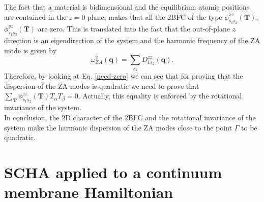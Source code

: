 The fact that a material is bidimensional and the equilibrium atomic positions are contained in the $z=0$ plane,
makes that all the 2BFC of the type $\phi_{s_{1}s_{2}}^{xz}(\mathbf{T})$, $\phi_{s_{1}s_{2}}^{yz}(\mathbf{T})$ are zero. This is translated into the fact that the out-of-plane $z$ direction is an eigendirection of the system and the 
harmonic frequency of the ZA mode is given by
\begin{equation} 
\omega_{ZA}^{2}(\mathbf{q})=\sum_{s_{2}}D_{1s_{2}}^{zz}(\mathbf{q}). 
\end{equation} 
Therefore, by looking at Eq. \ref{need-zero} we can see that for proving that the dispersion of the ZA modes is quadratic we need to prove that 
$\sum_{\mathbf{T}}\phi_{s_{1}s_{2}}^{zz}(\mathbf{T})T_{\alpha}T_{\beta}=0$. Actually, this equality is enforced by the rotational invariance of the system. \\

In conclusion, the 2D character of the 2BFC and the rotational invariance of the system make the harmonic dispersion of the ZA modes close to the point $\Gamma$ to be quadratic.

\section{SCHA applied to a continuum membrane Hamiltonian}

